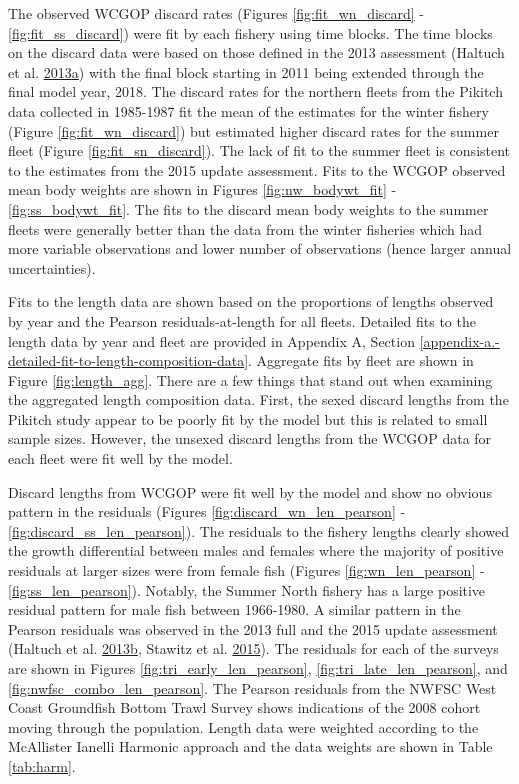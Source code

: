 \documentclass[12pt,]{article}
\begin{document}
The observed WCGOP discard rates (Figures \ref{fig:fit_wn_discard} -
\ref{fig:fit_ss_discard}) were fit by each fishery using time blocks.
The time blocks on the discard data were based on those defined in the
2013 assessment (Haltuch et al.
\protect\hyperlink{ref-haltuch_california_2013}{2013}\protect\hyperlink{ref-haltuch_california_2013}{a})
with the final block starting in 2011 being extended through the final
model year, 2018. The discard rates for the northern fleets from the
Pikitch data collected in 1985-1987 fit the mean of the estimates for
the winter fishery (Figure \ref{fig:fit_wn_discard}) but estimated
higher discard rates for the summer fleet (Figure
\ref{fig:fit_sn_discard}). The lack of fit to the summer fleet is
consistent to the estimates from the 2015 update assessment. Fits to the
WCGOP observed mean body weights are shown in Figures
\ref{fig:nw_bodywt_fit} - \ref{fig:ss_bodywt_fit}. The fits to the
discard mean body weights to the summer fleets were generally better
than the data from the winter fisheries which had more variable
observations and lower number of observations (hence larger annual
uncertainties).

Fits to the length data are shown based on the proportions of lengths
observed by year and the Pearson residuals-at-length for all fleets.
Detailed fits to the length data by year and fleet are provided in
Appendix A, Section
\ref{appendix-a.-detailed-fit-to-length-composition-data}. Aggregate
fits by fleet are shown in Figure \ref{fig:length_agg}. There are a few
things that stand out when examining the aggregated length composition
data. First, the sexed discard lengths from the Pikitch study appear to
be poorly fit by the model but this is related to small sample sizes.
However, the unsexed discard lengths from the WCGOP data for each fleet
were fit well by the model.

Discard lengths from WCGOP were fit well by the model and show no
obvious pattern in the residuals (Figures
\ref{fig:discard_wn_len_pearson} - \ref{fig:discard_ss_len_pearson}).
The residuals to the fishery lengths clearly showed the growth
differential between males and females where the majority of positive
residuals at larger sizes were from female fish (Figures
\ref{fig:wn_len_pearson} - \ref{fig:ss_len_pearson}). Notably, the
Summer North fishery has a large positive residual pattern for male fish
between 1966-1980. A similar pattern in the Pearson residuals was
observed in the 2013 full and the 2015 update assessment (Haltuch et al.
\protect\hyperlink{ref-haltuch_status_2013}{2013}\protect\hyperlink{ref-haltuch_status_2013}{b},
Stawitz et al. \protect\hyperlink{ref-stawitz_stock_2015}{2015}). The
residuals for each of the surveys are shown in Figures
\ref{fig:tri_early_len_pearson}, \ref{fig:tri_late_len_pearson}, and
\ref{fig:nwfsc_combo_len_pearson}. The Pearson residuals from the NWFSC
West Coast Groundfish Bottom Trawl Survey shows indications of the 2008
cohort moving through the population. Length data were weighted
according to the McAllister Ianelli Harmonic approach and the data
weights are shown in Table \ref{tab:harm}.
\end{document}
